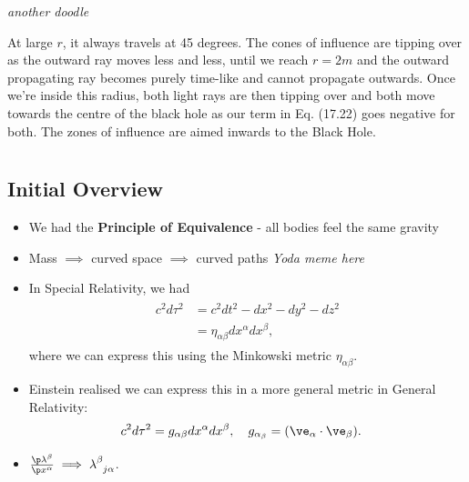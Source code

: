 \documentclass[a4paper, 11pt, normalem]{report}
\begin{document}
\emph{another doodle}
\begin{figure}[H]
    \centering
\end{figure}
At large $r$, it always travels at 45 degrees. 
The cones of influence are tipping over as the outward ray moves less and less, until we reach $r=2m$ and the outward propagating ray becomes purely time-like and cannot propagate outwards.
Once we're inside this radius, both light rays are then tipping over and both move towards the centre of the black hole as our term in Eq. (17.22) goes negative for both.
The zones of influence are aimed inwards to the Black Hole.

\chapter{}
\section{Initial Overview}
\begin{itemize}
    \item We had the \textbf{Principle of Equivalence} - all bodies feel the same gravity
    \item Mass $\implies$ curved space $\implies$ curved paths \emph{Yoda meme here}
    \item In Special Relativity, we had
        \begin{align}
            \begin{split}
                c^2d\tau^2 &= c^2dt^2 - dx^2 - dy^2 - dz^2 \\
                           &= \eta_{\alpha\beta}dx^\alpha dx^\beta,
            \end{split}
        \end{align}
        where we can express this using the Minkowski metric $\eta_{\alpha\beta}$.
    \item Einstein realised we can express this in a more general metric in General Relativity:
        \begin{align}
            c^2d\tau^2 &= g_{\alpha\beta}dx^\alpha dx^\beta,\quad g_{\alpha_\beta} = (\ve_{\alpha}\cdot\ve_{\beta}).
        \end{align}
    \item $\frac{\p\lambda^\beta}{\p x^\alpha} \implies \tensor{\lambda}{^\beta_{j\alpha}}$.
\end{itemize}
\end{document}
